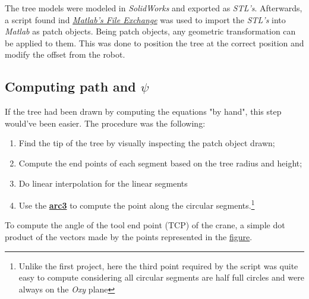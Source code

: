 \documentclass{report}
\begin{document}
The tree models were modeled in \textit{SolidWorks} and exported as
\textit{STL's}. Afterwards, a script found ind
\href{https://www.mathworks.com/matlabcentral/fileexchange/22409-stl-file-reader?s_tid=srchtitle}{\textit{Matlab's
        File Exchange}} was used to import the \textit{STL's} into \textit{Matlab} as
patch objects. Being patch objects, any geometric transformation can be applied
to them. This was done to position the tree at the correct position and modify
the offset from the robot.

\subsection{Computing path and $\psi$}

If the tree had been drawn by computing the equations "by hand", this step
would've been easier. The procedure was the following:\begin{enumerate}
    \item Find the tip of the tree by visually inspecting the patch object drawn;
    \item Compute the end points of each segment based on the tree radius and height;
    \item Do linear interpolation for the linear segments
    \item Use the
          \href{https://www.mathworks.com/matlabcentral/fileexchange/123050-3d-arc-passing-through-3-points?s_tid=srchtitle}{\textbf{arc3}}
          to compute the point along the circular segments.\footnote{Unlike the first
              project, here the third point required by the script was quite easy to
              compute considering all circular segments are half full circles and were
              always on the \textit{Oxy} plane}
\end{enumerate}

To compute the angle of the tool end point (TCP) of the crane, a simple dot
product of the vectors made by the points represented in the \hyperref[fig:psi]{figure}.
\end{document}
